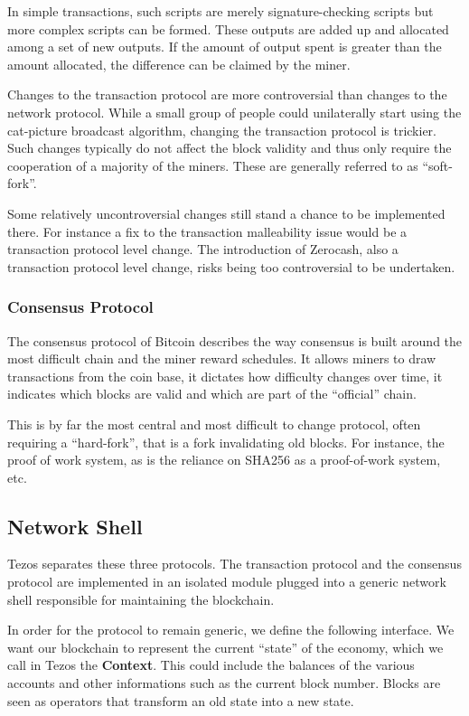 \documentclass[letterpaper]{article}
\begin{document}
In simple transactions, such scripts are merely signature-checking scripts but
more complex scripts can be formed. These outputs are added up and allocated
among a set of new outputs. If the amount of output spent is greater than the
amount allocated, the difference can be claimed by the miner.

Changes to the transaction protocol are more controversial than changes to
the network protocol. While a small group of people could unilaterally start
using the cat-picture broadcast algorithm, changing the transaction protocol
is trickier. Such changes typically do not affect the block validity
and thus only require the cooperation of a majority of the miners.
These are generally referred to as ``soft-fork''.

Some relatively uncontroversial changes still stand a chance to be implemented
there. For instance a fix to the transaction malleability issue would be a
transaction protocol level change. The introduction of Zerocash, also a
transaction protocol level change, risks being too controversial to be
undertaken.

\subsubsection{Consensus Protocol}
The consensus protocol of Bitcoin describes the way consensus is built
around the most difficult chain and the miner reward schedules.
It allows miners to draw transactions from the coin base,
it dictates how difficulty changes over time,
it indicates which blocks are valid
and which are part of the ``official'' chain.

This is by far the most central and most difficult to change protocol,
often requiring a ``hard-fork'', that is a fork invalidating old blocks.
For instance, the proof of work system, as is the reliance on SHA256 as a
proof-of-work system, etc.

\subsection{Network Shell}
Tezos separates these three protocols.
The transaction protocol and the consensus protocol
are implemented in an isolated module plugged
into a generic network shell responsible for maintaining the blockchain.

In order for the protocol to remain generic, we define the following interface.
We want our blockchain to represent the current ``state'' of the economy,
which we call in Tezos the \textbf{Context}.
This could include the balances of the various accounts
and other informations such as the current block number.
Blocks are seen as operators that transform an old state into a new state.
\end{document}
